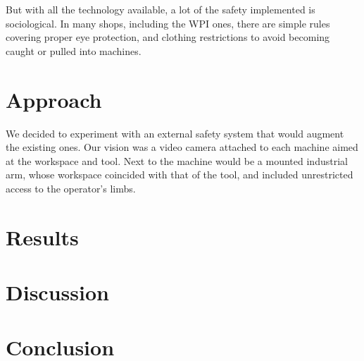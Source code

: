 \documentclass[12pt]{article}
\begin{document}
But with all the technology available, a lot of the safety implemented is sociological. In many shops, including the WPI ones, there are simple rules covering proper eye protection, and clothing restrictions to avoid becoming caught or pulled into machines\cite{WPI:safety}.

\section{Approach}
We decided to experiment with an external safety system that would augment the existing ones. Our vision was a video camera attached to each machine aimed at the workspace and tool. Next to the machine would be a mounted industrial arm, whose workspace coincided with that of the tool, and included unrestricted access to the operator's limbs.

\section{Results}


\section{Discussion}


\section{Conclusion}




\end{document}
